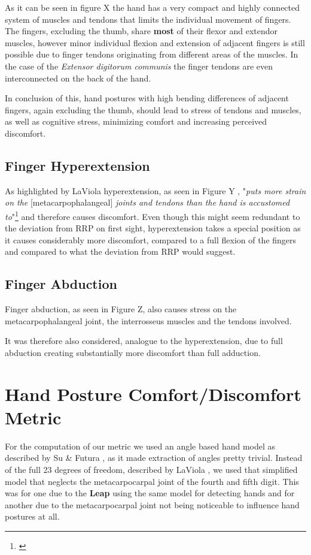 \documentclass{sig-alternate-05-2015}
\begin{document}
As it can be seen in figure X
the hand has a very compact and highly connected system of muscles and tendons that limits the individual movement of fingers.
The fingers, excluding the thumb, share \textbf{most} of their flexor and extendor muscles, however minor individual flexion and extension of adjacent fingers is still possible due to finger tendons originating from different areas of the muscles. In the case of the \textit{Extensor digitorum communis} the finger tendons are even interconnected on the back of the hand. 

In conclusion of this, hand postures with high bending differences of adjacent fingers, again excluding the thumb, should lead to stress of tendons and muscles, as well as cognitive stress, minimizing comfort and increasing perceived discomfort.

\subsection{Finger Hyperextension}

As highlighted by LaViola \cite{laviola1999survey} hyperextension, as seen in Figure Y
, "\textit{puts more strain on the }[metacarpophalangeal] \textit{joints and tendons than the hand is accustomed to}"\footnote{\cite{laviola1999survey}} and therefore causes discomfort. Even though this might seem redundant to the deviation from RRP on first sight, hyperextension takes a special position as it causes considerably more discomfort, compared to a full flexion of the fingers and compared to what the deviation from RRP would suggest.

\subsection{Finger Abduction}

Finger abduction, as seen in Figure Z,
also causes stress on the metacarpophalangeal joint, the interrosseus muscles and the tendons involved.

It was therefore also considered, analogue to the hyperextension, due to full abduction creating substantially more discomfort than full adduction.


\section{Hand Posture Comfort/Discomfort Metric}
For the computation of our metric we used an angle based hand model as described by Su \& Futura \cite{su1994logical}, as it made extraction of angles pretty trivial. Instead of the full 23 degrees of freedom, described by LaViola \cite{laviola1999survey}, we used that simplified model that neglects the metacarpocarpal joint of the fourth and fifth digit. This was for one due to the \textbf{Leap} using the same model for detecting hands and for another due to the metacarpocarpal joint not being noticeable to influence hand postures at all.
\end{document}
